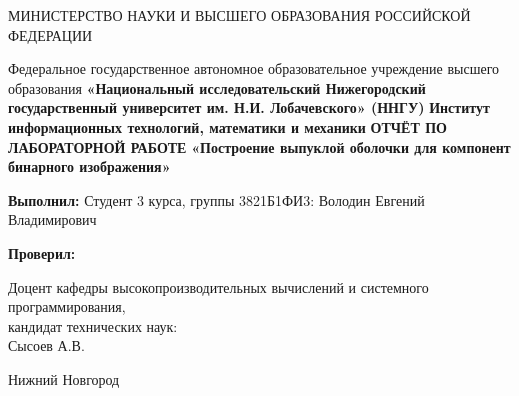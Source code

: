 \newcommand{\TeacherName}{
	Доцент кафедры высокопроизводительных вычислений и системного программирования,\\ кандидат технических наук:\\ 
	Сысоев А.В.
}
\newcommand{\LabName}{Построение выпуклой оболочки для компонент бинарного изображения}

\begin{titlepage}
	\begin{center}
		МИНИСТЕРСТВО НАУКИ И ВЫСШЕГО ОБРАЗОВАНИЯ РОССИЙСКОЙ ФЕДЕРАЦИИ\n
		{\fontsize{14pt}{10pt}\selectfont 
		Федеральное государственное автономное образовательное учреждение высшего образования\n
		\textbf{«Национальный исследовательский Нижегородский государственный университет им. Н.И. Лобачевского»\n
		(ННГУ)}\n
		\vspace{14pt}
		\textbf{Институт информационных технологий, математики и механики}\n
		\vspace{140pt}
		\textbf{ОТЧЁТ ПО ЛАБОРАТОРНОЙ РАБОТЕ}\n
		\vspace{14pt}
		\textbf{«\LabName»}\n
		\vspace{56pt}
		
	}
	\end{center}
	\hfill
	\begin{minipage}{0.5\textwidth}
		\textbf{Выполнил:\n}
		Студент 3 курса, группы 3821Б1ФИ3:\n
		Володин Евгений Владимирович\n
		
		\textbf{Проверил:\n} 
		\TeacherName\n
	\end{minipage}
	\vfill
	\begin{center}
		Нижний Новгород
	\end{center}
\end{titlepage}